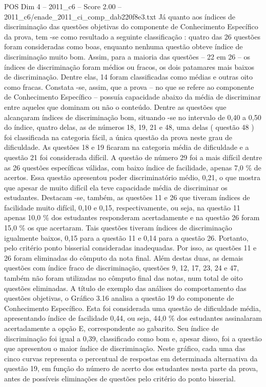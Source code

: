 \begin{textsample}{POS Dim 4 – 2011\_c6 – Score 2.00 – 2011\_c6/enade\_2011\_ci\_comp\_dab220f8e3.txt}
Já quanto aos índices de discriminação das questões objetivas do componente de Conhecimento Específico da prova, tem -se como resultado a seguinte classificação : quatro das 26 questões foram consideradas como boas, enquanto nenhuma questão obteve índice de discriminação muito bom.
Assim, para a maioria das questões – 22 em 26 – os índices de discriminação foram médios ou fracos, os dois patamares mais baixos de discriminação.
Dentre elas, 14 foram classificadas como médias e outras oito como fracas.
Constata -se, assim, que a prova – no que se refere ao componente de Conhecimento Específico – possuía capacidade abaixo da média de discriminar entre aqueles que dominam ou não o conteúdo.
Dentre as questões que alcançaram índices de discriminação bom, situando -se no intervalo de 0,40 a 0,50 do índice, quatro delas, as de números 18, 19, 21 e 48, uma delas ( questão 48 ) foi classificada na categoria fácil, a única questão da prova neste grau de dificuldade.
As questões 18 e 19 ficaram na categoria média de dificuldade e a questão 21 foi considerada difícil.
A questão de número 29 foi a mais difícil dentre as 26 questões específicas válidas, com baixo índice de facilidade, apenas 7,0 \% de acertos.
Essa questão apresentou poder discriminatório médio, 0,21, o que mostra que apesar de muito difícil ela teve capacidade média de discriminar os estudantes.
Destacam -se, também, as questões 11 e 26 que tiveram índices de facilidade muito difícil, 0,10 e 0,15, respectivamente, ou seja, na questão 11 apenas 10,0 \% dos estudantes responderam acertadamente e na questão 26 foram 15,0 \% os que acertaram.
Tais questões tiveram índices de discriminação igualmente baixos, 0,15 para a questão 11 e 0,14 para a questão 26.
Portanto, pelo critério ponto bisserial consideradas inadequadas.
Por isso, as questões 11 e 26 foram eliminadas do cômputo da nota final.
Além destas duas, as demais questões com índice fraco de discriminação, questões 9, 12, 17, 23, 24 e 47, também não foram utilizadas no cômputo final das notas, num total de oito questões eliminadas.
A título de exemplo das análises do comportamento das questões objetivas, o Gráfico 3.16 analisa a questão 19 do componente de Conhecimento Específico.
Esta foi considerada uma questão de dificuldade média, apresentando índice de facilidade 0,44, ou seja, 44,0 \% dos estudantes assinalaram acertadamente a opção E, correspondente ao gabarito.
Seu índice de discriminação foi igual a 0,39, classificado como bom e, apesar disso, foi a questão que apresentou o maior índice de discriminação.
Neste gráfico, cada uma das cinco curvas representa o percentual de respostas em determinada alternativa da questão 19, em função do número de acerto dos estudantes nesta parte da prova, antes de possíveis eliminações de questões pelo critério do ponto bisserial.

\end{textsample}
